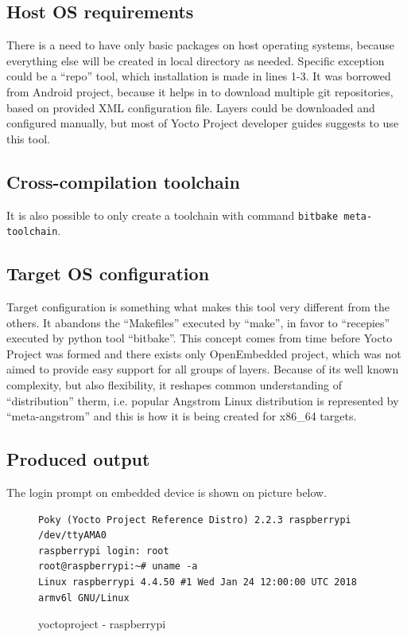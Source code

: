 \documentclass[printmode]{mgr}
\begin{document}
\subsection*{Host OS requirements}

There is a need to have only basic packages on host operating systems, because everything else will be created in local directory as needed.
Specific exception could be a ``repo'' tool, which installation is made in lines 1-3.
It was borrowed from Android project, because it helps in to download multiple git repositories, based on provided XML configuration file.
Layers could be downloaded and configured manually, but most of Yocto Project developer guides suggests to use this tool.

\subsection*{Cross-compilation toolchain}
It is also possible to only create a toolchain with command \verb|bitbake meta-toolchain|.

\subsection*{Target OS configuration}
Target configuration is something what makes this tool very different from the others.
It abandons the ``Makefiles'' executed by ``make'', in favor to ``recepies'' executed by python tool ``bitbake''.
This concept comes from time before Yocto Project was formed and there exists only OpenEmbedded project, which was not aimed to provide easy support for all groups of layers.
Because of its well known complexity, but also flexibility, it reshapes common understanding of ``distribution'' therm, i.e. popular Angstrom Linux distribution is represented by ``meta-angstrom'' and this is how it is being created for x86\_64 targets.

\subsection*{Produced output}
The login prompt on embedded device is shown on picture below.


\begin{figure}
    \centering
\begin{verbatim}
Poky (Yocto Project Reference Distro) 2.2.3 raspberrypi /dev/ttyAMA0
raspberrypi login: root
root@raspberrypi:~# uname -a
Linux raspberrypi 4.4.50 #1 Wed Jan 24 12:00:00 UTC 2018 armv6l GNU/Linux
\end{verbatim}
    \caption{yoctoproject - raspberrypi}
\end{figure}
\end{document}
